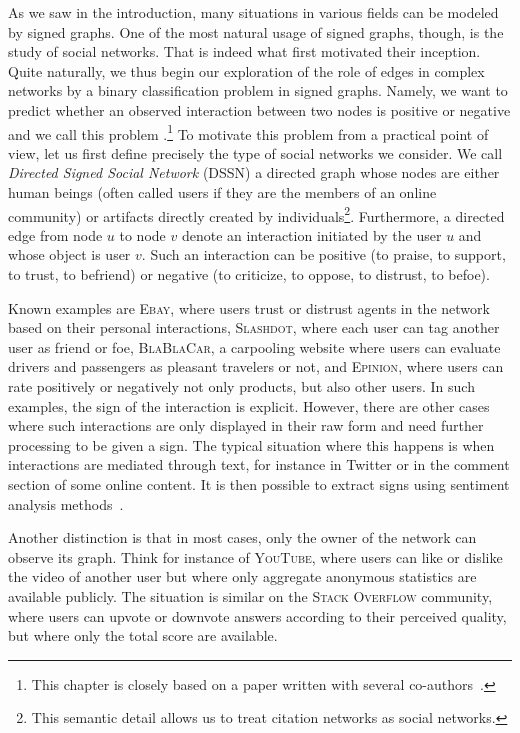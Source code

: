 As we saw in the introduction, many situations in various fields can be modeled by signed graphs.
One of the most natural usage of signed graphs, though, is the study of social networks. That is
indeed what first motivated their inception. Quite naturally, we thus begin our exploration of the
role of edges in complex networks by a binary classification problem in signed graphs. Namely, we
want to predict whether an observed interaction between two nodes is positive or negative and we
call this problem \esp{}.\footnote{This chapter is closely based on a paper written with several
co-authors~\autocite{trollSign17}.} To motivate this problem from a practical point of view, let us
first define precisely the type of social networks we consider. We call \emph{Directed Signed Social
Network} (DSSN) a directed graph whose nodes are either human beings (often called users if they are
the members of an online community) or artifacts directly created by individuals\footnote{This
semantic detail allows us to treat citation networks as social networks.}. Furthermore, a directed
edge from node $u$ to node $v$ denote an interaction initiated by the user $u$ and whose object is
user $v$. Such an interaction can be positive (to praise, to support, to trust, to befriend) or
negative (to criticize, to oppose, to distrust, to befoe).

Known examples are \textsc{Ebay}, where users trust or distrust agents in the network based on their
personal interactions, \textsc{Slashdot}, where each user can tag another user as friend or foe,
\textsc{BlaBlaCar}, a carpooling website where users can evaluate drivers and passengers as pleasant
travelers or not, and \textsc{Epinion}, where users can rate positively or negatively not only
products, but also other users. In such examples, the sign of the interaction is explicit. However,
there are other cases where such interactions are only displayed in their raw form and need further
processing to be given a sign. The typical situation where this happens is when interactions are
mediated through text, for instance in Twitter or in the comment section of some online content. It
is then possible to extract signs using sentiment analysis methods~\autocite{signedText12}.

Another distinction is that in most cases, only the owner of the network can observe its graph.
Think for instance of \textsc{YouTube}, where users can like or dislike the video of another user
but where only aggregate anonymous statistics are available publicly. The situation is similar on
the \textsc{Stack Overflow} community, where users can upvote or downvote answers according to their
perceived quality, but where only the total score are available.

